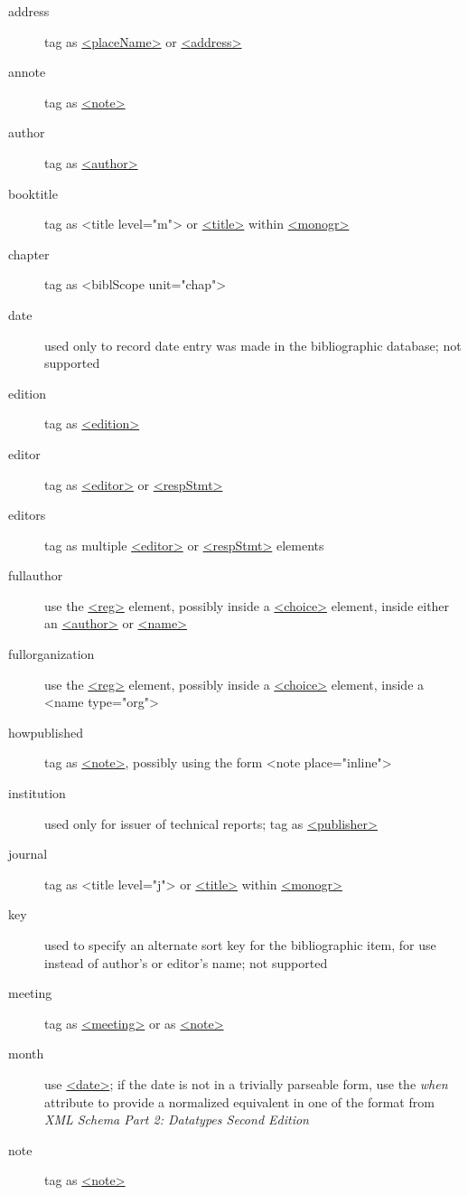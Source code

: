 \begin{description}
\item[{address}]tag as \hyperref[TEI.placeName]{<placeName>} or \hyperref[TEI.address]{<address>}
\item[{annote}]tag as \hyperref[TEI.note]{<note>}
\item[{author}]tag as \hyperref[TEI.author]{<author>}
\item[{booktitle}]tag as <title level="m"> or \hyperref[TEI.title]{<title>} within \hyperref[TEI.monogr]{<monogr>}
\item[{chapter}]tag as <biblScope unit="chap">
\item[{date}]used only to record date entry was made in the bibliographic database; not supported
\item[{edition}]tag as \hyperref[TEI.edition]{<edition>}
\item[{editor}]tag as \hyperref[TEI.editor]{<editor>} or \hyperref[TEI.respStmt]{<respStmt>}
\item[{editors}]tag as multiple \hyperref[TEI.editor]{<editor>} or \hyperref[TEI.respStmt]{<respStmt>} elements
\item[{fullauthor}]use the \hyperref[TEI.reg]{<reg>} element, possibly inside a \hyperref[TEI.choice]{<choice>} element, inside either an \hyperref[TEI.author]{<author>} or \hyperref[TEI.name]{<name>}
\item[{fullorganization}]use the \hyperref[TEI.reg]{<reg>} element, possibly inside a \hyperref[TEI.choice]{<choice>} element, inside a <name type="org">
\item[{howpublished}]tag as \hyperref[TEI.note]{<note>}, possibly using the form <note place="inline">
\item[{institution}]used only for issuer of technical reports; tag as \hyperref[TEI.publisher]{<publisher>}
\item[{journal}]tag as <title level="j"> or \hyperref[TEI.title]{<title>} within \hyperref[TEI.monogr]{<monogr>}
\item[{key}]used to specify an alternate sort key for the bibliographic item, for use instead of author's or editor's name; not supported
\item[{meeting}]tag as \hyperref[TEI.meeting]{<meeting>} or as \hyperref[TEI.note]{<note>}
\item[{month}]use \hyperref[TEI.date]{<date>}; if the date is not in a trivially parseable form, use the {\itshape when} attribute to provide a normalized equivalent in one of the format from \textit{XML Schema Part 2: Datatypes Second Edition}
\item[{note}]tag as \hyperref[TEI.note]{<note>}

\end{description}

